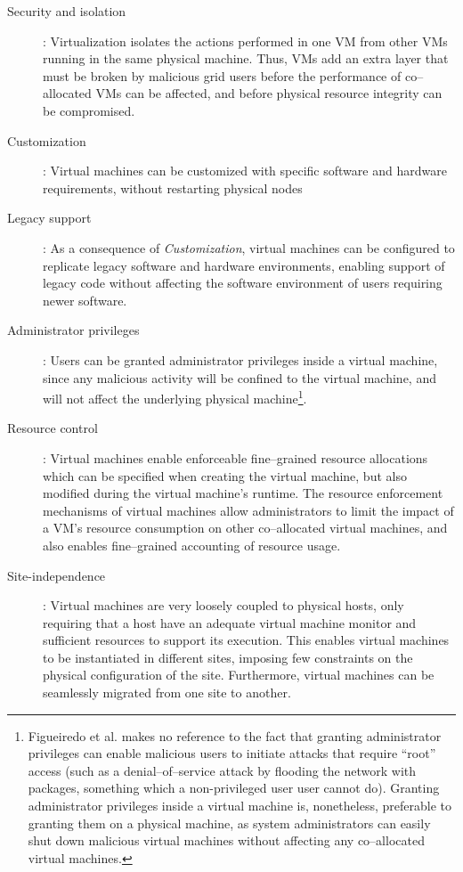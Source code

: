 \documentclass[singlespace]{ccw_chithesis}
\begin{document}
\begin{description}
\item[Security and isolation]: Virtualization isolates the actions performed in one VM from other VMs running in the same physical machine. Thus, VMs add an extra layer that must be broken by malicious grid users before the performance of co--allocated VMs can be affected, and before physical resource integrity can be compromised.
\item[Customization]: Virtual machines can be customized with specific software and hardware requirements, without restarting physical nodes
\item[Legacy support]: As a consequence of \emph{Customization}, virtual machines can be configured to replicate legacy software and hardware environments, enabling support of legacy code without affecting the software environment of users requiring newer software.
\item[Administrator privileges]: Users can be granted administrator privileges inside a virtual machine, since any malicious activity will be confined to the virtual machine, and will not affect the underlying physical machine\footnote{Figueiredo et al. makes no reference to the fact that granting administrator privileges can enable malicious users to initiate attacks that require ``root'' access (such as a denial--of--service attack by flooding the network with packages, something which a non-privileged user user cannot do). Granting administrator privileges inside a virtual machine is, nonetheless, preferable to granting them on a physical machine, as system administrators can easily shut down malicious virtual machines without affecting any co--allocated virtual machines.}.
\item[Resource control]: Virtual machines enable enforceable fine--grained resource allocations which can be specified when creating the virtual machine, but also modified during the virtual machine's runtime. The resource enforcement mechanisms of virtual machines allow administrators to limit the impact of a VM's resource consumption on other co--allocated virtual machines, and also enables fine--grained accounting of resource usage. 
\item[Site-independence]: Virtual machines are very loosely coupled to physical hosts, only requiring that a host have an adequate virtual machine monitor and sufficient resources to support its execution. This enables virtual machines to be instantiated in different sites, imposing few constraints on the physical configuration of the site. Furthermore, virtual machines can be seamlessly migrated from one site to another.
\end{description}
\end{document}

